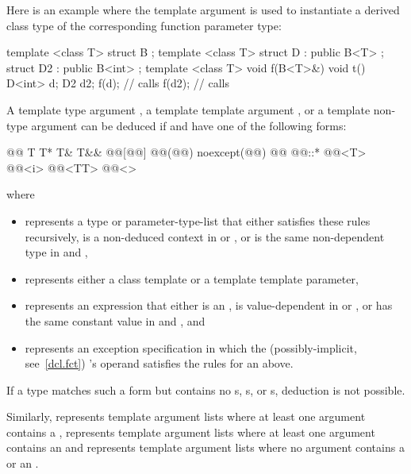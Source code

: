 \begin{example}
Here is an example where the template argument is used to instantiate
a derived class type of the corresponding function parameter type:

\begin{codeblock}
template <class T> struct B { };
template <class T> struct D : public B<T> {};
struct D2 : public B<int> {};
template <class T> void f(B<T>&) {}
void t() {
  D<int> d;
  D2     d2;
  f(d);             // calls 
  f(d2);            // calls 
}
\end{codeblock}
\end{example}

\pnum
A template type argument
,
a template template argument
,
or a template non-type argument
can be deduced if
and
have one of the following forms:
\begin{codeblock}
@\opt{\cv{}}@ T
T*
T&
T&&
@@[@@]
@@(@@) noexcept(@@)
@@ @@::*
@@<T>
@@<i>
@@<TT>
@@<>
\end{codeblock}
where
\begin{itemize}
\item
{} represents a type or parameter-type-list that either
satisfies these rules recursively,
is a non-deduced context in  or , or
is the same non-dependent type in  and ,

\item
{} represents either a class template or
a template template parameter,

\item
{} represents an expression that either
is an ,
is value-dependent in  or , or
has the same constant value in  and , and

\item
{} represents an
exception specification
in which the (possibly-implicit, see~\ref{dcl.fct})
's operand
satisfies the rules for an  above.
\end{itemize}

\begin{note}
If a type matches such a form but contains no
s, s, or s, deduction is not possible.
\end{note}

Similarly,
represents template argument lists where at least one argument contains a
,
represents template argument lists where at least one argument contains an
and
\tcode{<>}
represents template argument lists where no argument contains a
or an
.


